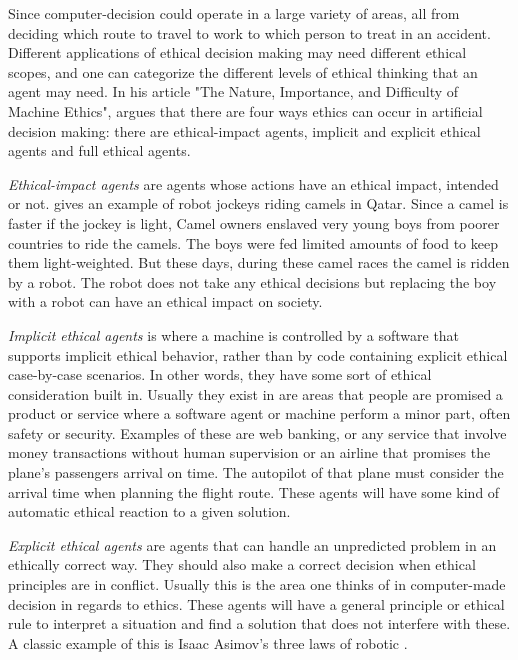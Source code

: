 \documentclass[11pt]{article}
\begin{document}
Since computer-decision could operate in a large variety of areas, all from deciding which route to travel to work to which person to treat in an accident. Different applications of ethical decision making may need different ethical scopes, and one can categorize the different levels of ethical thinking that an agent may need. In his article "The Nature, Importance, and Difficulty of Machine Ethics", \citeauthor{moor2006nature} argues that there are four ways ethics can occur in artificial decision making: there are ethical-impact agents, implicit and explicit ethical agents and full ethical agents.

\textit{Ethical-impact agents} are agents whose actions have an ethical impact, intended or not. \citeauthor{moor2006nature} gives an example of robot jockeys riding camels in Qatar. Since a camel is faster if the jockey is light, Camel owners enslaved very young boys from poorer countries to ride the camels. The boys were fed limited amounts of food to keep them light-weighted. But these days, during these camel races the camel is ridden by a robot. The robot does not take any ethical decisions but replacing the boy with a robot can have an ethical impact on society.

\textit{Implicit ethical agents} is where a machine is controlled by a software that supports implicit ethical behavior, rather than by code containing explicit ethical case-by-case scenarios. In other words, they have some sort of ethical consideration built in. Usually they exist in are areas that people are promised a product or service where a software agent or machine perform a minor part, often safety or security. Examples of these are web banking, or any service that involve money transactions without human supervision or an airline that promises the plane's passengers arrival on time. The autopilot of that plane must consider the arrival time when planning the flight route. These agents will have some kind of automatic ethical reaction to a given solution.

\textit{Explicit ethical agents} are agents that can handle an unpredicted problem in an ethically correct way. They should also make a correct decision when ethical principles are in conflict. Usually this is the area one thinks of in computer-made decision in regards to ethics. These agents will have a general principle or ethical rule to interpret a situation and find a solution that does not interfere with these. A classic example of this is Isaac Asimov's three laws of robotic \cite{asimov1950irobot}.
\end{document}
